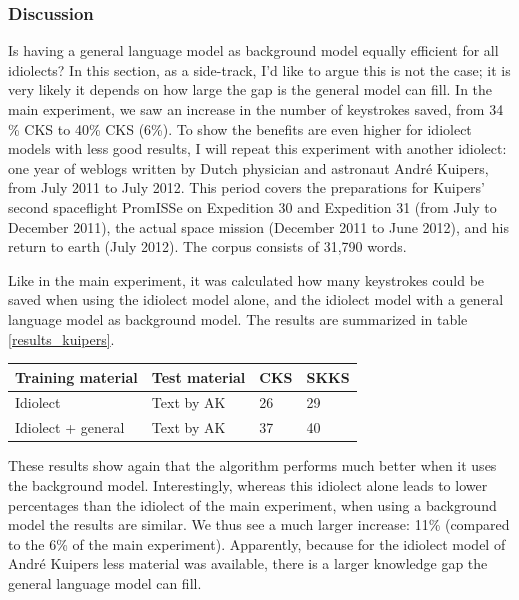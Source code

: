 \documentclass[12pt]{article}
\let\originaltable\table
\let\endoriginaltable\endtable
\renewenvironment{table}[1][ht]{%
  \originaltable[#1]
  \centering}%
  {\endoriginaltable}
\begin{document}
\subsubsection{Discussion} \label{simple_exp_disc}
Is having a general language model as background model equally efficient for all idiolects? In this section, as a side-track, I'd like to argue this is not the case; it is very likely it depends on how large the gap is the general model can fill. In the main experiment, we saw an increase in the number of keystrokes saved, from 34 \% CKS to 40\% CKS (6\%). To show the benefits are even higher for idiolect models with less good results, I will repeat this experiment with another idiolect: one year of weblogs written by Dutch physician and astronaut Andr\'e Kuipers, from July 2011 to July 2012. This period covers the preparations for Kuipers' second spaceflight PromISSe on Expedition 30 and Expedition 31 (from July to December 2011), the actual space mission (December 2011 to June 2012), and his return to earth (July 2012). The corpus consists of 31,790 words. 

Like in the main experiment, it was calculated how many keystrokes could be saved when using the idiolect model alone, and the idiolect model with a general language model as background model. The results are summarized in table \ref{results_kuipers}. 

\begin{table}[H]
\begin{tabular}{ll|ll} 
Training material&Test material&CKS&SKKS\\
\hline
Idiolect&Text by AK&26&29\\
Idiolect + general&Text by AK&37&40\\
\end{tabular} 
\caption{Percentage of keystrokes that can be saved when using the idiolect of Andr\'e Kuipers, with and without background model} \label{results_kuipers}
\end{table}

These results show again that the algorithm performs much better when it uses the background model. Interestingly, whereas this idiolect alone leads to lower percentages than the idiolect of the main experiment, when using a background model the results are similar. We thus see a much larger increase: 11\% (compared to the 6\% of the main experiment). Apparently, because for the idiolect model of Andr\'e Kuipers less material was available, there is a larger knowledge gap the general language model can fill.
\end{document}
